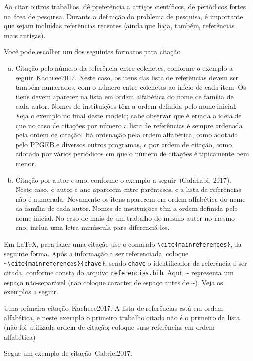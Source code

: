 \documentclass[a4paper, 12pt]{ppgeb}
\begin{document}
Ao citar outros trabalhos, dê preferência a artigos científicos, de periódicos fortes na área de pesquisa. Durante a definição do problema de pesquisa, é importante que sejam incluídas referências recentes (ainda que haja, também, referências mais antigas).

Você pode escolher um dos seguintes formatos para citação:
\begin{enumerate}[a)]
\item Citação pelo número da referência entre colchetes, conforme o exemplo a seguir~\cite{mainreferences}{Kachuee2017}. Neste caso, os itens das lista de referências devem ser também numerados, com o número entre colchetes ao início de cada item. Os itens devem aparecer na lista em ordem alfabética do nome de família de cada autor. Nomes de instituições têm a ordem definida pelo nome inicial. Veja o exemplo no final deste modelo; cabe observar que é errada a ideia de que no caso de citações por número a lista de referências é sempre ordenada pela ordem de citação. Há ordenação pela ordem alfabética, como adotado pelo PPGEB e diversos outros programas, e por ordem de citação, como adotado por vários periódicos em que o número de citações é tipicamente bem menor.
\item Citação por autor e ano, conforme o exemplo a seguir~(Galahabi, 2017). Neste caso, o autor e ano aparecem entre parênteses, e a lista de referências não é numerada. Novamente os itens aparecem em ordem alfabética do nome da família de cada autor. Nomes de instituições têm a ordem definida pelo nome inicial. No caso de mais de um trabalho do mesmo autor no mesmo ano, inclua uma letra minúscula para diferenciá-los.
\end{enumerate}

Em LaTeX, para fazer uma citação use o comando \verb|\cite{mainreferences}|, da seguinte forma. Após a informação a ser referenciada, coloque \verb|~\cite{mainreferences}{chave}|, sendo \verb|chave| o identificador da referência a ser citada, conforme consta do arquivo \verb|referencias.bib|. Aqui, \verb|~| representa um espaço não-separável (não coloque caracter de espaço antes de \verb|~|). Veja os exemplos a seguir.

Uma primeira citação~\cite{mainreferences}{Kachuee2017}. A lista de referências está em ordem alfabética, e neste exemplo o primeiro trabalho citado não é o primeiro da lista (não foi utilizada ordem de citação; coloque suas referências em ordem alfabética).

Segue um exemplo de citação~\cite{mainreferences}{Gabriel2017}.
\end{document}
